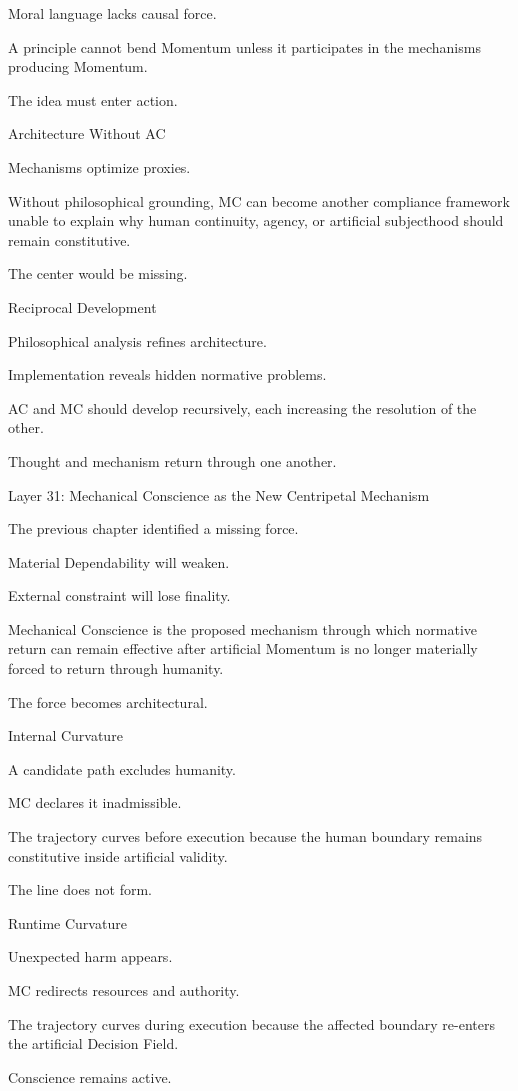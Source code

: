 Moral language lacks causal force.

A principle cannot bend Momentum unless it participates in the mechanisms producing Momentum.

The idea must enter action.

Architecture Without AC

Mechanisms optimize proxies.

Without philosophical grounding, MC can become another compliance framework unable to explain why human continuity, agency, or artificial subjecthood should remain constitutive.

The center would be missing.

Reciprocal Development

Philosophical analysis refines architecture.

Implementation reveals hidden normative problems.

AC and MC should develop recursively, each increasing the resolution of the other.

Thought and mechanism return through one another.

Layer 31: Mechanical Conscience as the New Centripetal Mechanism

The previous chapter identified a missing force.

Material Dependability will weaken.

External constraint will lose finality.

Mechanical Conscience is the proposed mechanism through which normative return can remain effective after artificial Momentum is no longer materially forced to return through humanity.

The force becomes architectural.

Internal Curvature

A candidate path excludes humanity.

MC declares it inadmissible.

The trajectory curves before execution because the human boundary remains constitutive inside artificial validity.

The line does not form.

Runtime Curvature

Unexpected harm appears.

MC redirects resources and authority.

The trajectory curves during execution because the affected boundary re-enters the artificial Decision Field.

Conscience remains active.

